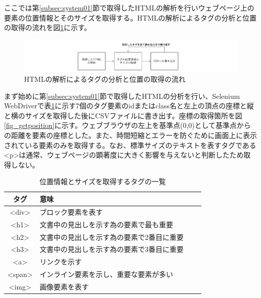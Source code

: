 \par ここでは第\ref{subsec:system01}節で取得したHTMLの解析を行いウェブページ上の要素の位置情報とそのサイズを取得する。HTMLの解析によるタグの分析と位置の取得の流れを図\ref{fig_system02}に示す。

\begin{figure}[H]
    \centering
    \includegraphics[width=12cm]{figures/system02.png}
    \caption{HTMLの解析によるタグの分析と位置の取得の流れ}
    \label{fig_system02}
\end{figure}

\par まず始めに第\ref{subsec:system01}節で取得したHTMLの分析を行い、Selenium WebDriverで表\ref{table:gettaglist}に示す7個のタグ要素のidまたはclass名と左上の頂点の座標と縦と横のサイズを取得した後にCSVファイルに書き出す。座標の取得箇所を図\ref{fig_getposition}に示す。ウェブブラウザの左上を基準点(0,0)として基準点からの距離を要素の座標とした。また、時間短縮とエラーを防ぐために画面上に表示されている要素のみを取得する。なお、標準サイズのテキストを表すタグである\textless p\textgreater は通常、ウェブページの顕著度に大きく影響を与えないと判断したため取得しない。

\begin{table}[h]
    \caption{位置情報とサイズを取得するタグの一覧}
    \label{table:gettaglist}
    \centering
     \begin{tabular}{clll}
      \hline
      タグ & 意味 \\
      \hline \hline
      \textless div\textgreater & ブロック要素を表す \\
      \textless h1\textgreater & 文書中の見出しを示す為の要素で最も重要 \\
      \textless h2\textgreater & 文書中の見出しを示す為の要素で2番目に重要 \\
      \textless h3\textgreater & 文書中の見出しを示す為の要素で3番目に重要 \\
      \textless a\textgreater & リンクを示す \\
      \textless span\textgreater & インライン要素を示し、重要な要素が多い \\
      \textless img\textgreater & 画像要素を表す \\
      \hline
    \end{tabular}
\end{table}

